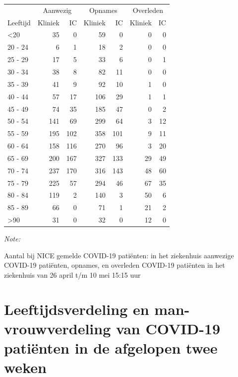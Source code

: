 \documentclass[
  english,
  man,floatsintext]{apa6}
\begin{document}
\begin{table}
\centering\begingroup\fontsize{10}{12}\selectfont

\begin{threeparttable}
\begin{tabular}{lrrrrrr}
\toprule
\multicolumn{1}{c}{ } & \multicolumn{2}{c}{Aanwezig} & \multicolumn{2}{c}{Opnames} & \multicolumn{2}{c}{Overleden} \\
\cmidrule(l{3pt}r{3pt}){2-3} \cmidrule(l{3pt}r{3pt}){4-5} \cmidrule(l{3pt}r{3pt}){6-7}
Leeftijd & Kliniek & IC & Kliniek & IC & Kliniek & IC\\
\midrule
<20 & 35 & 0 & 59 & 0 & 0 & 0\\
20 - 24 & 6 & 1 & 18 & 2 & 0 & 0\\
25 - 29 & 17 & 5 & 33 & 6 & 0 & 1\\
30 - 34 & 38 & 8 & 82 & 11 & 0 & 0\\
35 - 39 & 41 & 9 & 92 & 10 & 1 & 0\\
40 - 44 & 57 & 17 & 106 & 29 & 1 & 1\\
45 - 49 & 74 & 35 & 185 & 47 & 0 & 2\\
50 - 54 & 141 & 69 & 299 & 64 & 3 & 12\\
55 - 59 & 195 & 102 & 358 & 101 & 9 & 11\\
60 - 64 & 158 & 116 & 270 & 96 & 3 & 20\\
65 - 69 & 200 & 167 & 327 & 133 & 29 & 49\\
70 - 74 & 237 & 170 & 316 & 143 & 48 & 60\\
75 - 79 & 225 & 57 & 294 & 46 & 67 & 35\\
80 - 84 & 119 & 2 & 140 & 3 & 50 & 6\\
85 - 89 & 66 & 0 & 71 & 1 & 21 & 2\\
>90 & 31 & 0 & 32 & 0 & 12 & 0\\
\bottomrule
\end{tabular}
\begin{tablenotes}
\item \textit{Note: } 
\item Aantal bij NICE gemelde COVID-19 patiënten: in het ziekenhuis aanwezige COVID-19 patiënten, opnames, en overleden COVID-19 patiënten in het ziekenhuis van 26 april t/m 10 mei 15:15 uur
\end{tablenotes}
\end{threeparttable}
\endgroup{}
\end{table}

\newpage

\hypertarget{leeftijdsverdeling-en-man-vrouwverdeling-van-covid-19-patiuxebnten-in-de-afgelopen-twee-weken}{%
\section{Leeftijdsverdeling en man-vrouwverdeling van COVID-19 patiënten in de afgelopen twee weken}\label{leeftijdsverdeling-en-man-vrouwverdeling-van-covid-19-patiuxebnten-in-de-afgelopen-twee-weken}}
\end{document}
